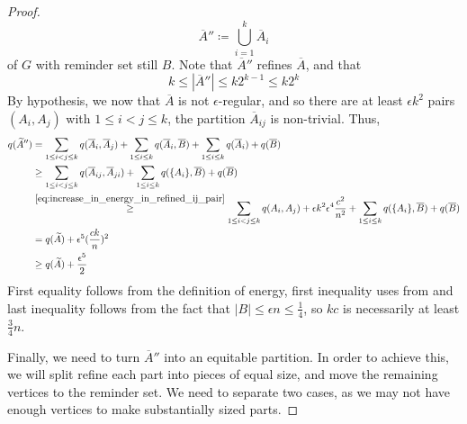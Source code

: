 \begin{lemma}
\begin{proof}
                \[
                    \overline{A}'' \coloneqq \bigcup_{i=1}^k \overline{A}_i
                \]
                of $G$ with reminder set still $B$.
                Note that $\overline{A}''$ refines $\overline{A}$, and that
                \begin{equation} \label{eq:size_of_refined_partition}
                    k \leq |\overline{A}''| \leq k 2^{k-1} \leq k 2^{k}
                \end{equation}
                By hypothesis, we now that $\overline{A}$ is not $\epsilon$-regular, and so there are at least
                $\epsilon k^2$ pairs $(A_i, A_j)$ with $1 \leq i < j \leq k$, the partition $\overline{A}_{ij}$ is
                non-trivial.
                Thus,
                \begin{align*}
                    q(\widetilde{A}'')
                        & = \sum_{1 \leq i < j \leq k} q(\overline{A}_i, \overline{A}_j) + \sum_{1 \leq i \leq k} q(\overline{A}_i, \overline{B})
                            + \sum_{1 \leq i \leq k} q(\overline{A}_i) + q(\overline{B}) \\
                        & \geq \sum_{1 \leq i < j \leq k} q(\overline{A}_{ij}, \overline{A}_{ji})
                            + \sum_{1 \leq i \leq k} q(\{ A_i \}, \overline{B}) + q(\overline{B}) \\
                        & \stackrel{\eqref{eq:increase_in_energy_in_refined_ij_pair}}{\geq}
                            \sum_{1 \leq i < j \leq k} q(A_i, A_j) + \epsilon k^2 \epsilon^4 \frac{c^2}{n^2}
                            + \sum_{1 \leq i \leq k} q(\{ A_i \}, \overline{B}) + q(\overline{B}) \\
                        & = q(\widetilde{A}) + \epsilon^5 ( \frac{c k}{n} )^2 \\
                        & \geq q(\widetilde{A}) + \frac{\epsilon^5}{2}
                \end{align*}
                First equality follows from the definition of energy, first inequality uses
                 from 
                and last inequality follows from the fact that
                $|B| \leq \epsilon n \leq \frac{1}{4}$, so $kc$ is necessarily at least $\frac{3}{4}n$.

                Finally, we need to turn $\overline{A}''$ into an equitable partition.
                In order to achieve this, we will split refine each part into pieces of equal size, and move the
                remaining vertices to the reminder set.
                We need to separate two cases, as we may not have enough vertices to make substantially sized parts.


\end{proof}
\end{lemma}
